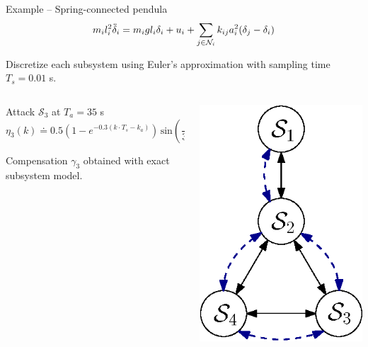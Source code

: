 \documentclass[presentation]{beamer}
\newcommand{\NN}{{\mathcal{N}}}
\begin{document}
\begin{frame}{Example -- Spring-connected pendula}
	\begin{equation*}
		m_il_i^2\Ddot{\delta}_i = m_igl_i\delta_i + u_i + \sum_{j\in\NN_i} k_{ij}a_i^2(\delta_j-\delta_i)
	\end{equation*}
	
	Discretize each subsystem using Euler's approximation with sampling time $T_s = 0.01$ s. %
	
	\vfill
	\begin{columns}
		\begin{column}{0.75\linewidth}
			Attack $\mathcal S_3 $ at $T_a = 35$ s
			$$\eta_3(k) \doteq 0.5 \left(1-e^{-0.3 (k\cdot T_s-k_a)}\right)\,\mathrm{sin}\left(\frac{2}{30} \pi k \cdot T_s\right)$$

			Compensation $\gamma_3$ obtained with exact subsystem model.
		\end{column}
		\begin{column}{0.23\linewidth}
			\includegraphics[scale=0.6]{fig/layout.eps}
		\end{column}
	\end{columns}
\end{frame}
\end{document}
